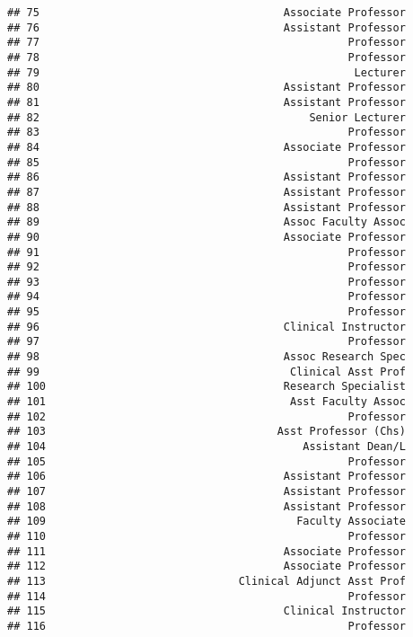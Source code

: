 \documentclass[
]{article}
\begin{document}
\begin{verbatim}
## 75                                      Associate Professor
## 76                                      Assistant Professor
## 77                                                Professor
## 78                                                Professor
## 79                                                 Lecturer
## 80                                      Assistant Professor
## 81                                      Assistant Professor
## 82                                          Senior Lecturer
## 83                                                Professor
## 84                                      Associate Professor
## 85                                                Professor
## 86                                      Assistant Professor
## 87                                      Assistant Professor
## 88                                      Assistant Professor
## 89                                      Assoc Faculty Assoc
## 90                                      Associate Professor
## 91                                                Professor
## 92                                                Professor
## 93                                                Professor
## 94                                                Professor
## 95                                                Professor
## 96                                      Clinical Instructor
## 97                                                Professor
## 98                                      Assoc Research Spec
## 99                                       Clinical Asst Prof
## 100                                     Research Specialist
## 101                                      Asst Faculty Assoc
## 102                                               Professor
## 103                                    Asst Professor (Chs)
## 104                                        Assistant Dean/L
## 105                                               Professor
## 106                                     Assistant Professor
## 107                                     Assistant Professor
## 108                                     Assistant Professor
## 109                                       Faculty Associate
## 110                                               Professor
## 111                                     Associate Professor
## 112                                     Associate Professor
## 113                              Clinical Adjunct Asst Prof
## 114                                               Professor
## 115                                     Clinical Instructor
## 116                                               Professor

\end{verbatim}
\end{document}
